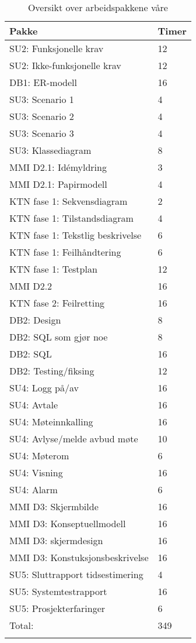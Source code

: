 \begin{center}
\label{tab:arbeidspakker}
\begin{longtable}{| l | l |}
\hline
Pakke & Timer\\
\hline
SU2: Funksjonelle krav & 12 \\
\hline
SU2: Ikke-funksjonelle krav & 12 \\
\hline
DB1: ER-modell & 16 \\
\hline
SU3: Scenario 1 & 4 \\
\hline
SU3: Scenario 2 & 4 \\
\hline
SU3: Scenario 3 & 4 \\
\hline
SU3: Klassediagram & 8 \\
\hline
MMI D2.1: Idémyldring & 3 \\
\hline
MMI D2.1: Papirmodell & 4 \\
\hline
KTN fase 1: Sekvensdiagram & 2 \\
\hline
KTN fase 1: Tilstandsdiagram & 4 \\
\hline
KTN fase 1: Tekstlig beskrivelse & 6 \\
\hline
KTN fase 1: Feilhåndtering & 6 \\
\hline
KTN fase 1: Testplan & 12 \\
\hline
MMI D2.2 & 16 \\
\hline
KTN fase 2: Feilretting & 16 \\
\hline
DB2: Design & 8 \\
\hline
DB2: SQL som gjør noe & 8 \\
\hline
DB2: SQL & 16 \\
\hline
DB2: Testing/fiksing & 12 \\
\hline
SU4: Logg på/av & 16\\
\hline
SU4: Avtale & 16\\
\hline
SU4: Møteinnkalling & 16\\
\hline
SU4: Avlyse/melde avbud møte & 10\\
\hline
SU4: Møterom & 6\\
\hline
SU4: Visning & 16\\
\hline
SU4: Alarm & 6\\
\hline
MMI D3: Skjermbilde & 16\\ %
\hline
MMI D3: Konseptuellmodell & 16\\
\hline
MMI D3: skjermdesign & 16\\
\hline
MMI D3: Konstuksjonsbeskrivelse & 16\\
\hline
SU5: Sluttrapport tidsestimering & 4\\
\hline
SU5: Systemtestrapport & 16\\
\hline
SU5: Prosjekterfaringer & 6\\
\hline
Total: & 349\\
\hline
\caption{Oversikt over arbeidspakkene våre}
\end{longtable}
\end{center}